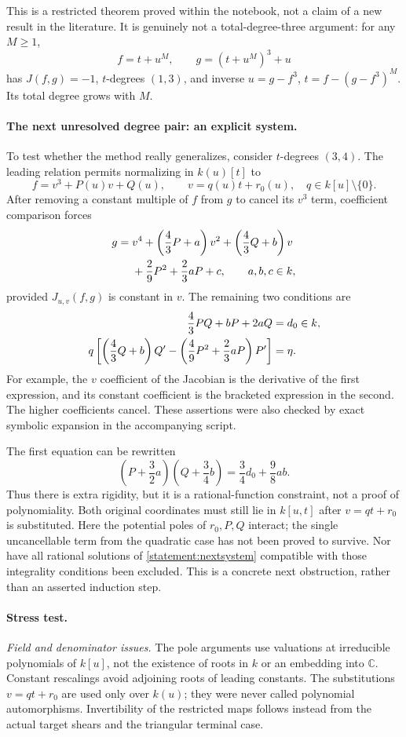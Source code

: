 \documentclass[11pt]{article}
\newcommand{\C}{\mathbb{C}}
\begin{document}
This is a restricted theorem proved within the notebook, not a claim of a
new result in the literature. It is genuinely not a total-degree-three
argument: for any $M\ge1$,
\[
 f=t+u^M,\qquad g=(t+u^M)^3+u
\]
has $J(f,g)=-1$, $t$-degrees $(1,3)$, and inverse
$u=g-f^3$, $t=f-(g-f^3)^M$. Its total degree grows with $M$.

\paragraph{The next unresolved degree pair: an explicit system.}
To test whether the method really generalizes, consider $t$-degrees $(3,4)$.
The leading relation permits normalizing in $k(u)[t]$ to
\[
 f=v^3+P(u)v+Q(u),\qquad v=q(u)t+r_0(u),\quad q\in k[u]\setminus\{0\}.
\]
After removing a constant multiple of $f$ from $g$ to cancel its $v^3$ term,
coefficient comparison forces
\begin{align}\label{statement:quartic}
 g={}&v^4+\left(\frac43P+a\right)v^2
           +\left(\frac43Q+b\right)v\\
    &+\frac29P^2+\frac23aP+c,\notag
 \qquad a,b,c\in k,
\end{align}
provided $J_{u,v}(f,g)$ is constant in $v$. The remaining two conditions are
\begin{align}\label{statement:nextsystem}
 \frac43PQ+bP+2aQ&=d_0\in k,\\
 q\left[\left(\frac43Q+b\right)Q'
      -\left(\frac49P^2+\frac23aP\right)P'\right]&=\eta.\notag
\end{align}
For example, the $v$ coefficient of the Jacobian is the derivative of the
first expression, and its constant coefficient is the bracketed expression
in the second. The higher coefficients cancel. These assertions were also
checked by exact symbolic expansion in the accompanying script.

The first equation can be rewritten
\[
 \left(P+\frac32a\right)\left(Q+\frac34b\right)
       =\frac34d_0+\frac98ab.
\]
Thus there is extra rigidity, but it is a rational-function constraint, not
a proof of polynomiality. Both original coordinates must still lie in
$k[u,t]$ after $v=qt+r_0$ is substituted. Here the potential poles of
$r_0,P,Q$ interact; the single uncancellable term from the quadratic case
has not been proved to survive. Nor have all rational solutions of
\eqref{statement:nextsystem} compatible with those integrality conditions been
excluded. This is a concrete next obstruction, rather than an asserted
induction step.

\paragraph{Stress test.}
\emph{Field and denominator issues.}
The pole arguments use valuations at irreducible polynomials of $k[u]$,
not the existence of roots in $k$ or an embedding into $\C$. Constant
rescalings avoid adjoining roots of leading constants. The substitutions
$v=qt+r_0$ are used only over $k(u)$; they were never called polynomial
automorphisms. Invertibility of the restricted maps follows instead from
the actual target shears and the triangular terminal case.
\end{document}
